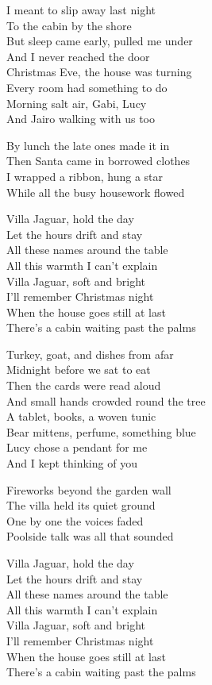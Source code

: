 \begin{lyrics}
I meant to slip away last night\\
To the cabin by the shore\\
But sleep came early, pulled me under\\
And I never reached the door\\
Christmas Eve, the house was turning\\
Every room had something to do\\
Morning salt air, Gabi, Lucy\\
And Jairo walking with us too

By lunch the late ones made it in\\
Then Santa came in borrowed clothes\\
I wrapped a ribbon, hung a star\\
While all the busy housework flowed

Villa Jaguar, hold the day\\
Let the hours drift and stay\\
All these names around the table\\
All this warmth I can’t explain\\
Villa Jaguar, soft and bright\\
I’ll remember Christmas night\\
When the house goes still at last\\
There’s a cabin waiting past the palms

Turkey, goat, and dishes from afar\\
Midnight before we sat to eat\\
Then the cards were read aloud\\
And small hands crowded round the tree\\
A tablet, books, a woven tunic\\
Bear mittens, perfume, something blue\\
Lucy chose a pendant for me\\
And I kept thinking of you

Fireworks beyond the garden wall\\
The villa held its quiet ground\\
One by one the voices faded\\
Poolside talk was all that sounded

Villa Jaguar, hold the day\\
Let the hours drift and stay\\
All these names around the table\\
All this warmth I can’t explain\\
Villa Jaguar, soft and bright\\
I’ll remember Christmas night\\
When the house goes still at last\\
There’s a cabin waiting past the palms


\end{lyrics}
